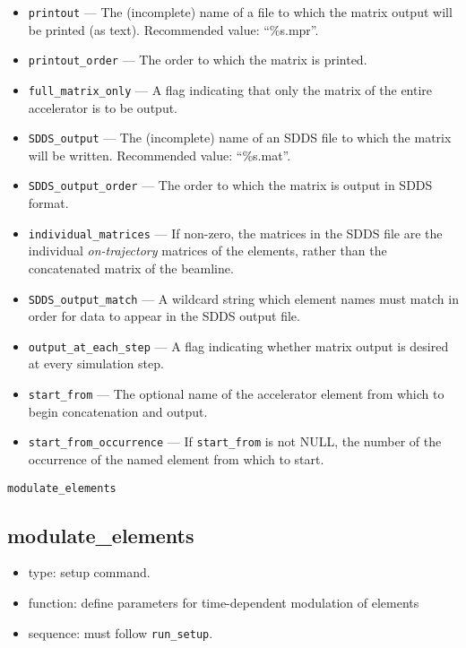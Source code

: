 \documentclass[11pt]{article}
\begin{document}
\begin{itemize}
\item \verb|printout| --- The (incomplete) name of a file to which the 
matrix output will be printed (as text).  Recommended value: ``\%s.mpr''.
\item \verb|printout_order| --- The order to which the matrix is printed.
\item \verb|full_matrix_only| --- A flag indicating that only the matrix of
the entire accelerator is to be output.
\item \verb|SDDS_output| --- The (incomplete) name of an SDDS 
file to which the matrix will be written.  Recommended value: ``\%s.mat''.
\item \verb|SDDS_output_order| --- The order to which the matrix is output in SDDS format.
\item \verb|individual_matrices| --- If non-zero, the matrices in the SDDS file are the individual
{\em on-trajectory} matrices of the elements, rather than the concatenated matrix of the beamline.
\item \verb|SDDS_output_match| --- A wildcard string which element names must match in
order for data to appear in the SDDS output file.
\item \verb|output_at_each_step| --- A flag indicating whether matrix output
is desired at every simulation step.
\item \verb|start_from| --- The optional name of the accelerator element
from which to begin concatenation and output.
\item \verb|start_from_occurrence| --- If \verb|start_from| is not NULL, the
number of the occurrence of the named element from which to start.
\end{itemize}

\newpage
\begin{center}{\Large\verb|modulate_elements|}\end{center}
\subsection{modulate\_elements\label{subsec:modulateelements}}

\begin{itemize}
\item type: setup command.
\item function: define parameters for time-dependent modulation of elements
\item sequence: must follow \verb|run_setup|.
\end{itemize}
\end{document}
